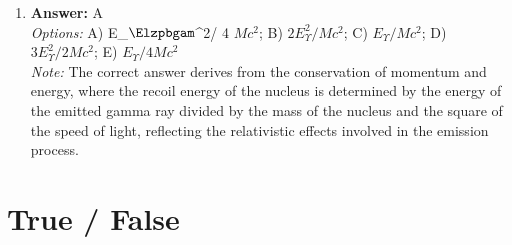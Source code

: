 \documentclass[12pt]{article}
\begin{document}
\begin{enumerate}[label=\arabic*.]
\item \textbf{Answer:} A
\\ \textit{Options:} A) E\_\ensuremath{\Elzpbgam}^2/ 4 $Mc^2$; B) \( 2 E_{\Upsilon}^2 / Mc^2 \); C) \( E_{\Upsilon} / Mc^2 \); D) \( 3 E_{\Upsilon}^2 / 2 Mc^2 \); E) \( E_{\Upsilon} / 4 Mc^2 \)
\\ \textit{Note:} The correct answer derives from the conservation of momentum and energy, where the recoil energy of the nucleus is determined by the energy of the emitted gamma ray divided by the mass of the nucleus and the square of the speed of light, reflecting the relativistic effects involved in the emission process.
\end{enumerate}

\section*{True / False}
\end{document}
